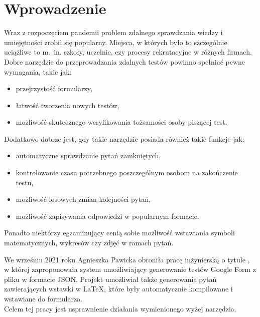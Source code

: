 \chapter{Wprowadzenie}%

Wraz z rozpoczęciem pandemii problem zdalnego sprawdzania wiedzy i umiejętności
 zrobił się popularny. Miejsca, w których było to szczególnie uciążliwe to m.~in. szkoły, 
uczelnie, czy procesy rekrutacyjne w różnych firmach. Dobre narzędzie do przeprowadzania zdalnych
testów powinno spełniać pewne wymagania, takie jak:
\begin{itemize}
  \item przejrzystość formularzy,
  \item łatwość tworzenia nowych testów,
  \item możliwość skutecznego weryfikowania tożsamości osoby piszącej test.
\end{itemize}
Dodatkowo dobrze jest, gdy takie narzędzie posiada również takie funkcje jak:
\begin{itemize}
  \item automatyczne sprawdzanie pytań zamkniętych,
  \item kontrolowanie czasu potrzebnego poszczególnym osobom na zakończenie testu,
  \item możliwość losowych zmian kolejności pytań,
  \item możliwość zapisywania odpowiedzi w popularnym formacie.
\end{itemize}
Ponadto niektórzy egzaminujący cenią sobie możliwość wstawiania symboli matematycznych, 
wykresów czy zdjęć w ramach pytań.

 We wrześniu 2021 roku Agnieszka Pawicka obroniła pracę inżynierską o tytule \ap, 
 w której zaproponowała system umożliwiający generowanie testów Google Form z pliku 
 w formacie JSON. Projekt umożliwiał także generowanie pytań zawierających wstawki w \LaTeX, 
 które były automatycznie kompilowane i wstawiane do formularza.
 \\ Celem tej pracy jest usprawnienie działania wymienionego wyżej narzędzia.
